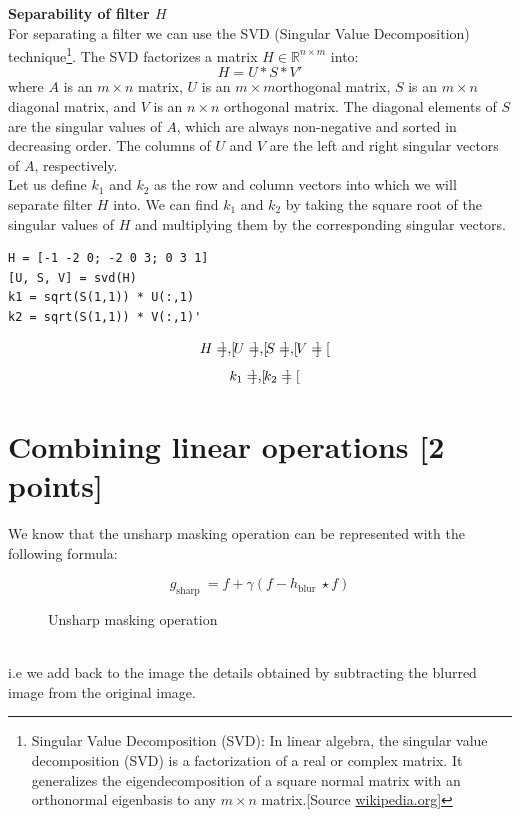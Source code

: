 \documentclass[tikz,14pt,fleqn]{article}
\begin{document}
\textbf{Separability of filter $H$}\\
For separating a filter we can use the SVD (Singular Value Decomposition) technique\footnote{Singular Value Decomposition (SVD): In linear algebra, the singular value decomposition (SVD) is a factorization of a real or complex matrix. It generalizes the eigendecomposition of a square normal matrix with an orthonormal eigenbasis to any $m\times n$ matrix.[Source \href{https://en.wikipedia.org/wiki/Singular_value_decomposition}{wikipedia.org}]}. The SVD factorizes a matrix $H\in\mathds{R}^{n\times m}$ into:
$$H = U * S * V'$$
where $A$ is an $m \times n$ matrix, $U$ is an $m \times m $orthogonal matrix, $S$ is an $m \times n$ diagonal matrix, and $V$ is an $n \times n$ orthogonal matrix. The diagonal elements of $S$ are the singular values of $A$, which are always non-negative and sorted in decreasing order. The columns of $U$ and $V$ are the left and right singular vectors of $A$, respectively.\\
Let us define $k_1$ and $k_2$ as the row and column vectors into which we will separate filter $H$ into. We can find $k_1$ and $k_2$ by taking the square root of the singular values of $H$ and multiplying them by the corresponding singular vectors.
\vspace{-0.5cm}
\begin{verbatim}
H = [-1 -2 0; -2 0 3; 0 3 1]
[U, S, V] = svd(H)
k1 = sqrt(S(1,1)) * U(:,1)
k2 = sqrt(S(1,1)) * V(:,1)'
\end{verbatim}
$$
H= \begin{bmatrix}  \end{bmatrix} , U= \begin{bmatrix}  \end{bmatrix} , S= \begin{bmatrix}  \end{bmatrix} , V= \begin{bmatrix}  \end{bmatrix} 
$$
$$
k_1= \begin{bmatrix}  \end{bmatrix} , k_2= \begin{bmatrix}  \end{bmatrix} 
$$
\section{Combining linear operations [2 points]}
We know that the unsharp masking operation can be represented with the following formula:
\begin{figure}[h!]
$$g_{\text {sharp }}=f+\gamma\left(f-h_{\text {blur }} \star f\right)$$
\caption{Unsharp masking operation}
\label{fig:2.1unsharpformula}
\end{figure}\\
i.e we add back to the image the details obtained by subtracting the blurred image from the original image.\\
\end{document}

